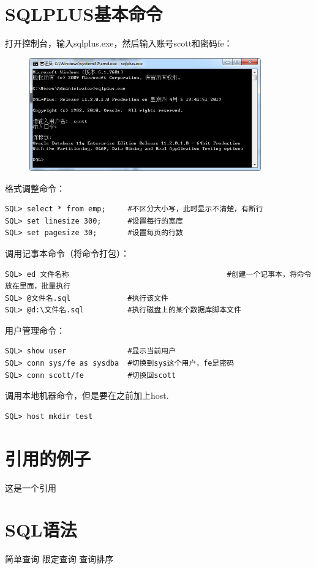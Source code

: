 \documentclass[a4paper,12pt]{ctexart}
\begin{document}
\section{SQLPLUS基本命令}
打开控制台，输入sqlplus.exe，然后输入账号scott和密码fe：
\begin{figure}[H]
  \centering
  \includegraphics[width=10cm]{oracle/打开sqlplus.png}
\end{figure}
格式调整命令：
\begin{verbatim}
SQL> select * from emp;     #不区分大小写，此时显示不清楚，有断行
SQL> set linesize 300;      #设置每行的宽度
SQL> set pagesize 30;       #设置每页的行数
\end{verbatim}

调用记事本命令（将命令打包）：
\begin{verbatim}
SQL> ed 文件名称                                    #创建一个记事本，将命令放在里面，批量执行
SQL> @文件名.sql             #执行该文件
SQL> @d:\文件名.sql          #执行磁盘上的某个数据库脚本文件
\end{verbatim}

用户管理命令：
\begin{verbatim}
SQL> show user              #显示当前用户
SQL> conn sys/fe as sysdba  #切换到sys这个用户，fe是密码
SQL> conn scott/fe          #切换回scott
\end{verbatim}

调用本地机器命令，但是要在之前加上host.
\begin{verbatim}
SQL> host mkdir test
\end{verbatim}
\section{引用的例子}
这是一个引用~\cite{LCN2002}

\section{SQL语法}
简单查询
限定查询
查询排序
\end{document}
